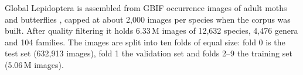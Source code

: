 Global Lepidoptera is assembled from GBIF occurrence images of adult moths and butterflies \autocite{gbif}, capped at about 2,000 images per species when the corpus was built.
After quality filtering it holds 6.33\,M images of 12,632 species, 4,476 genera and 104 families.
The images are split into ten folds of equal size: fold 0 is the test set (632,913 images), fold 1 the validation set and folds 2--9 the training set (5.06\,M images).

